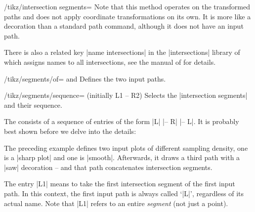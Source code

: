 {\begin{key}{/tikz/intersection segments=}
    Note that this method operates on the transformed paths and does not apply
    coordinate transformations on its own. It is more like a decoration than a
    standard path command, although it does not have an input path.

    There is also a related key |name intersections| in the |intersections|
    library of \tikzname{} which assigns names to all intersections, see the
    manual of \tikzname{} for details.
\end{key}

\begin{key}{/tikz/segments/of= and }
    Defines the two input paths.
\end{key}

\begin{key}{/tikz/segments/sequence= (initially L1 -- R2)}
    Selects the |intersection segments| and their sequence.

    The  consists of a sequence of entries of the
    form |L| |-- R| |-- L|. It is probably
    best shown before we delve into the details:
\begin{codeexample}[]
\end{codeexample}
    The preceding example defines two input plots of different sampling
    density, one is a |sharp plot| and one is |smooth|. Afterwards, it draws a
    third path with a |saw| decoration -- and that path concatenates
    intersection segments.

    The entry |L1| means to take the first intersection segment of the first
    input path. In this context, the first input path is always called `|L|',
    regardless of its actual name. Note that |L1| refers to an entire
    \emph{segment} (not just a point).


\end{key}}
